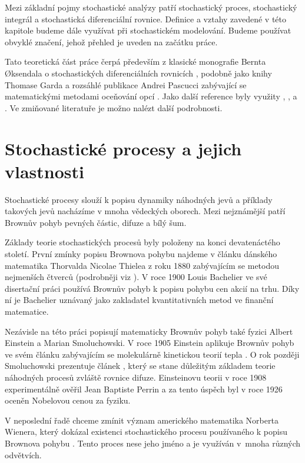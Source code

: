 \documentclass[a4paper,12pt]{report}
\theoremstyle{definition} \newtheorem{definice}[veta]{Definice}
\theoremstyle{remark}
\begin{document}
Mezi základní pojmy stochastické analýzy patří stochastický proces, stochastický integrál a stochastická diferenciální rovnice.
Definice a vztahy zavedené v této kapitole budeme dále využívat při stochastickém modelování.
Budeme používat obvyklé značení, jehož přehled je uveden na začátku práce. 

Tato teoretická část práce čerpá především z klasické monografie Bernta {\O}ksendala o stochastických diferenciálních rovnicích \cite{oksendal2003stochastic}, 
podobně jako knihy Thomase Garda  \cite{gard} 
a rozsáhlé publikace Andrei Pascucci zabývající se matematickými metodami oceňování opcí \cite{pascucci}.
Jako další reference byly využity \cite{karatzas2012brownian}, \cite{allen2010introduction},  \cite{shreve2012stochastic} a \cite{shreve2004stochastic}.
Ve zmiňované literatuře je možno nalézt další podrobnosti.

\section{Stochastické procesy a jejich vlastnosti}
Stochastické procesy slouží k popisu dynamiky náhodných jevů a příklady takových jevů nacházíme v mnoha vědeckých oborech.
Mezi nejznámější patří Brownův pohyb pevných částic, difuze a bílý šum.

Základy teorie stochastických procesů byly položeny na konci devatenáctého století.
První zmínky popisu Brownova pohybu najdeme v článku dánského matematika Thorvalda Nicolae Thielea z roku 1880 zabývajícím se metodou nejmenších čtverců (podrobněji viz \cite{lauritzen2002thiele}). %
V roce 1900 Louis Bachelier ve své disertační práci \cite{bachelier} používá Brownův pohyb k popisu pohybu cen akcií na trhu.
Díky ní je Bachelier uznávaný jako zakladatel kvantitativních metod ve finanční matematice.

Nezávisle na této práci popisují matematicky Brownův pohyb také fyzici Albert Einstein a Marian Smoluchowski. 
V roce 1905 Einstein aplikuje Brownův pohyb ve svém článku zabývajícím se molekulárně kinetickou teorií tepla \cite{einstein}.
O rok později Smoluchowski prezentuje článek \cite{Smoluchowski}, který se stane důležitým základem teorie náhodných procesů zvláště rovnice difuze.
Einsteinovu teorii v roce 1908 experimentálně ověřil Jean Baptiste Perrin \cite{perrin2013brownian} a za tento úspěch byl v roce 1926 oceněn Nobelovou cenou za fyziku. 

V neposlední řadě chceme zmínit význam amerického matematika Norberta Wienera, který dokázal existenci stochastického procesu používaného k popisu Brownova pohybu \cite{wiener1923differential}. 
Tento proces nese jeho jméno a je využíván v~mnoha různých odvětvích.
\end{document}

